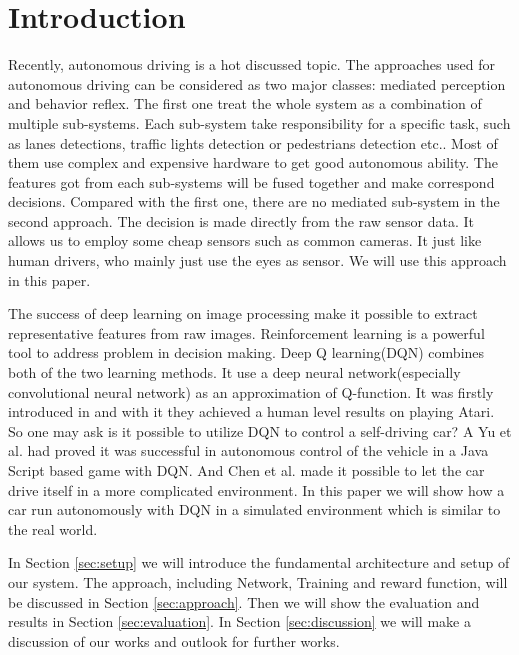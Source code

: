 
\section{Introduction}

Recently, autonomous driving is a hot discussed topic. The approaches used for autonomous driving can be considered as two major classes: mediated perception and behavior reflex. The first one treat the whole system as a combination of multiple sub-systems. Each sub-system take responsibility for a specific task, such as lanes detections, traffic lights detection or pedestrians detection etc.. Most of them use complex and expensive hardware to get good autonomous ability. The features got from each sub-systems will be fused together and make correspond decisions. Compared with the first one, there are no mediated sub-system in the second approach. The decision is made directly from the raw sensor data. It allows us to employ some cheap sensors such as common cameras. It just like human drivers, who mainly just use the eyes as sensor. We will use this approach in this paper.

The success of deep learning on image processing make it possible to extract representative features from raw images. Reinforcement learning is a powerful tool to address problem in decision making. Deep Q learning(DQN) combines both of the two learning methods. It use a deep neural network(especially convolutional neural network) as an approximation of Q-function. It was firstly introduced in \cite{Mnih13} and with it they achieved  a human level results on playing Atari. So one may ask is it possible to utilize DQN to control a self-driving car? A Yu et al. \cite{yudeep} had proved it was successful in autonomous control of the vehicle in a Java Script based game with DQN. And Chen et al. \cite{chen2015deepdriving} made it possible to let the car drive itself in a more complicated environment. In this paper we will show how a car run autonomously with DQN in a simulated environment which is similar to the real world. 

In Section \ref{sec:setup} we will introduce the fundamental architecture and setup of our system. The approach, including Network, Training and reward function, will be discussed in Section \ref{sec:approach}. Then we will show the evaluation and results in Section \ref{sec:evaluation}. In Section \ref{sec:discussion} we will make a discussion of our works and outlook for further works. 

